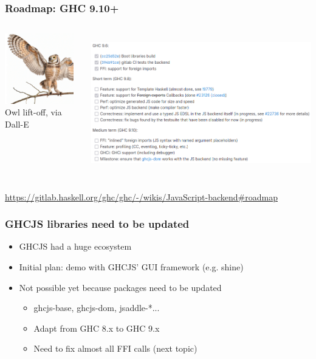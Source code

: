 \documentclass{beamer}
\begin{document}
\begin{frame}
\frametitle{Roadmap: GHC 9.10+}
\begin{columns}

\begin{column}{0.25\textwidth}
\begin{center}
\includegraphics[width=3cm]{images/owl4.png}\\
\tiny Owl lift-off, via Dall-E
\end{center}
\end{column}

\begin{column}{0.7\textwidth}
\includegraphics[height=6cm]{images/roadmap.png}
\end{column}

\end{columns}

\begin{center}
\url{https://gitlab.haskell.org/ghc/ghc/-/wikis/JavaScript-backend\#roadmap}
\end{center}

\end{frame}



\begin{frame}
\frametitle{GHCJS libraries need to be updated}

\begin{itemize}
\item GHCJS had a huge ecosystem
\item Initial plan: demo with GHCJS' GUI framework (e.g. shine)
\item Not possible yet because packages need to be updated
\begin{itemize}
\item ghcjs-base, ghcjs-dom, jsaddle-*...
\item Adapt from GHC 8.x to GHC 9.x
\item Need to fix almost all FFI calls (next topic)
\end{itemize}
\end{itemize}
\end{frame}
\end{document}
